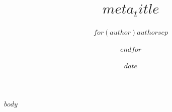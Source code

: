 \documentclass[
$if(fontsize)$
  $fontsize$,
$endif$
$if(papersize)$
  $papersize$paper,
$endif$
$for(classoption)$
  $classoption$$sep$,
$endfor$
]{moderncv}
\title{$meta_title$}
\author{$for(author)$$author$$sep$ \and $endfor$}
\date{$date$}
\begin{document}
\makecvtitle

$body$
\end{document}
